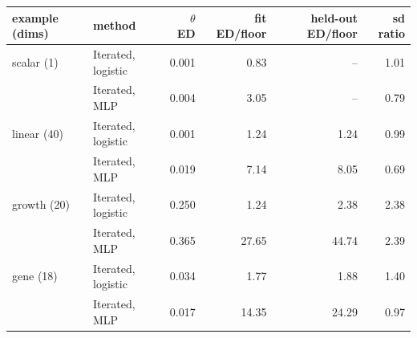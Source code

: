 \begin{tabular}{llrrrr}
\toprule
example (dims) & method & $\theta$ ED & fit ED/floor & held-out ED/floor & sd ratio \\
\midrule
scalar (1) & Iterated, logistic & 0.001 & 0.83 & -- & 1.01 \\
 & Iterated, MLP & 0.004 & 3.05 & -- & 0.79 \\ \addlinespace
linear (40) & Iterated, logistic & 0.001 & 1.24 & 1.24 & 0.99 \\
 & Iterated, MLP & 0.019 & 7.14 & 8.05 & 0.69 \\ \addlinespace
growth (20) & Iterated, logistic & 0.250 & 1.24 & 2.38 & 2.38 \\
 & Iterated, MLP & 0.365 & 27.65 & 44.74 & 2.39 \\ \addlinespace
gene (18) & Iterated, logistic & 0.034 & 1.77 & 1.88 & 1.40 \\
 & Iterated, MLP & 0.017 & 14.35 & 24.29 & 0.97 \\
\bottomrule
\end{tabular}
